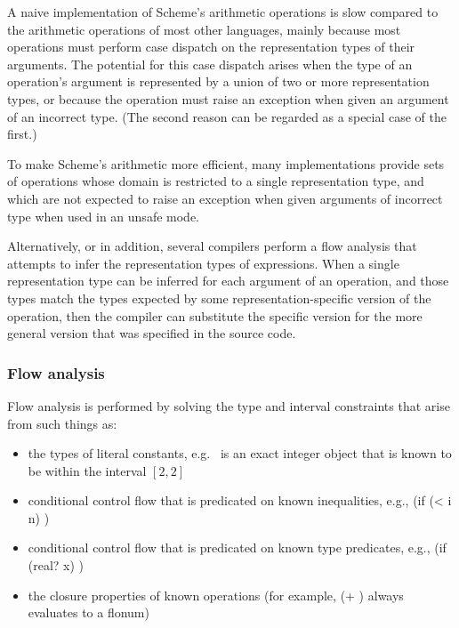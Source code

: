 \documentclass[twoside,twocolumn]{algol60}
\begin{document}
A naive implementation of Scheme's arithmetic operations is slow
compared to the arithmetic operations of most other languages, mainly
because most operations must perform case dispatch on the
representation types of their arguments.  The potential for this case
dispatch arises when the type of an operation's argument is
represented by a union of two or more representation types, or because
the operation must raise an exception when given an argument of
an incorrect type.  (The second reason can be regarded as a special
case of the first.)

To make Scheme's arithmetic more efficient, many implementations
provide sets of operations whose domain is restricted to a single
representation type, and which are not expected to raise an exception
when given arguments of incorrect type when used in an unsafe mode.

Alternatively, or in addition, several compilers perform a
flow analysis that attempts to infer the representation types of
expressions.  When a single representation type can be inferred for
each argument of an operation, and those types match the types
expected by some representation-specific version of the operation,
then the compiler can substitute the specific version for the more
general version that was specified in the source code.

\subsubsection{Flow analysis}

Flow analysis is performed by solving the type and interval
constraints that arise from such things as:

\begin{itemize}
\item the types of literal constants, e.g.\ {} is an exact
  integer object
  that is known to be within the interval $[2,2]$
  
\item conditional control flow that is predicated on known
  inequalities, e.g., {\cf (if (< i n)  )}
  
\item conditional control flow that is predicated on known type
  predicates, e.g., {\cf (if (real? x)  )}
  
\item the closure properties of known operations (for example, {\cf (+
     )} always evaluates to a flonum)
\end{itemize}
  
\end{document}
